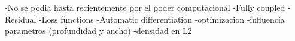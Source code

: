 \label{chp:ApendixNN}
-No se podia hasta recientemente por el poder computacional
-Fully coupled
-Residual
-Loss functions
-Automatic differentiation
-optimizacion
-influencia parametros (profundidad y ancho)
-densidad en L2
